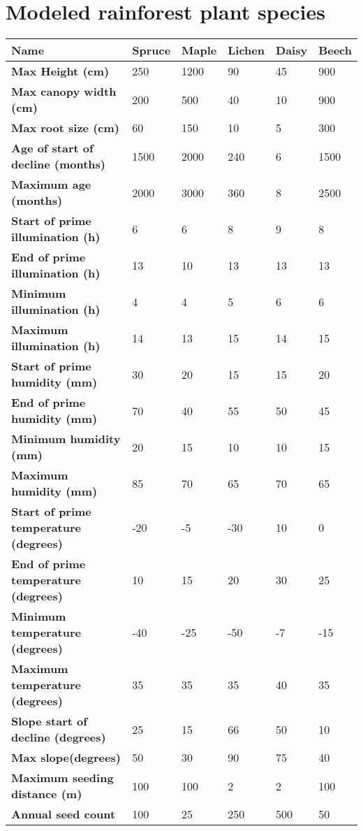 \chapter{Modeled rainforest plant species} \label{AppendixF}

\begin{longtable}{|p{4cm}|p{2cm}|p{2cm}|p{2cm}|p{2cm}|p{2cm}|}
		\hline		
		\textbf{Name} & \textbf{Spruce} & \textbf{Maple} & \textbf{Lichen} & \textbf{Daisy} & \textbf{Beech}\\
		\hline
		\textbf{Max Height (cm)} & 
		250 & 
		1200 & 
		90 & 
		45 & 
		900\\
		\hline
		\textbf{Max canopy width (cm)} & 
		200 & 
		500 & 
		40 & 
		10 & 
		900 \\
		\hline
		\textbf{Max root size (cm)} & 
		60 & 
		150 & 
		10 & 
		5 & 
		300 \\
		\hline
		\textbf{Age of start of decline (months)} & 
		1500 & 
		2000 & 
		240 & 
		6 & 
		1500 \\
		\hline
		\textbf{Maximum age (months)} & 
		2000 & 
		3000 & 
		360 & 
		8 & 
		2500 \\
		\hline
		\textbf{Start of prime illumination (h)} &
		6 & 
		6 & 
		8 & 
		9 & 
		8 \\
		\hline
		\textbf{End of prime illumination (h)} & 
		13 & 
		10 & 
		13 & 
		13 & 
		13 \\
		\hline
		\textbf{Minimum illumination (h)} & 
		4 & 
		4 & 
		5 & 
		6 & 
		6 \\
		\hline
		\textbf{Maximum illumination (h)} & 
		14 & 
		13 & 
		15 & 
		14 & 
		15 \\
		\hline
		\textbf{Start of prime humidity (mm)} & 
		30 & 
		20 & 
		15 & 
		15 & 
		20 \\
		\hline
		\textbf{End of prime humidity (mm)} & 
		70 & 
		40 & 
		55 & 
		50 & 
		45 \\
		\hline
		\textbf{Minimum humidity (mm)} &
		20 & 
		15 & 
		10 & 
		10 & 
		15 \\
		\hline
		\textbf{Maximum humidity (mm)} & 
		85 & 
		70 & 
		65 & 
		70 & 
		65 \\
		\hline
		\textbf{Start of prime temperature (degrees)} & 
		-20 & 
		-5 & 
		-30 & 
		10 & 
		0 \\
		\hline
		\textbf{End of prime temperature (degrees)} & 
		10 & 
		15 & 
		20 & 
		30 & 
		25 \\
		\hline
		\textbf{Minimum temperature (degrees)} & 
		-40 & 
		-25 & 
		-50 & 
		-7 & 
		-15 \\
		\hline
		\textbf{Maximum temperature (degrees)} & 
		35 & 
		35 & 
		35 & 
		40 & 
		35 \\
		\hline
		\textbf{Slope start of decline (degrees)} & 
		25 & 
		15 & 
		66 & 
		50 & 
		10 \\
		\hline
		\textbf{Max slope(degrees)} & 
		50 & 
		30 & 
		90 & 
		75 & 
		40 \\
		\hline
		\textbf{Maximum seeding distance (m)} & 
		100 & 
		100 & 
		2 & 
		2 & 
		100 \\
		\hline
		\textbf{Annual seed count} & 
		100 & 
		25 & 
		250 & 
		500 & 
		50 \\
		\hline                                                                           
\end{longtable}